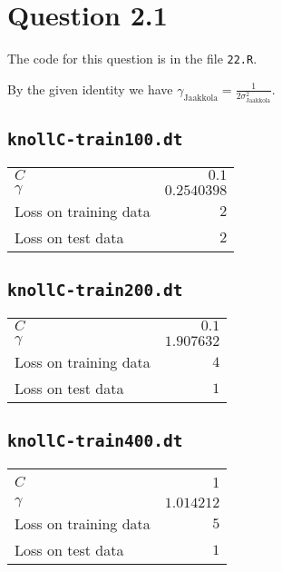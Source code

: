 \section*{Question 2.1}

The code for this question is in the file \texttt{22.R}.


By the given identity we have
$\gamma_{\text{Jaakkola}}=\frac{1}{2\sigma_{\text{Jaakkola}}^2}$.

\subsection*{\texttt{knollC-train100.dt}}
\begin{tabular}{|l|r|}
$C$ & $0.1$ \\
$\gamma$ & $0.2540398$ \\\hline
Loss on training data & $2$ \\
Loss on test data & $2$ \\\hline
\end{tabular}

\subsection*{\texttt{knollC-train200.dt}}
\begin{tabular}{|l|r|}
$C$ & $0.1$ \\
$\gamma$ & $1.907632$ \\\hline
Loss on training data & $4$ \\
Loss on test data & $1$ \\\hline
\end{tabular}

\subsection*{\texttt{knollC-train400.dt}}
\begin{tabular}{|l|r|}
$C$ & 1 \\
$\gamma$ & $1.014212$ \\\hline
Loss on training data & $5$ \\
Loss on test data & $1$ \\\hline
\end{tabular}
